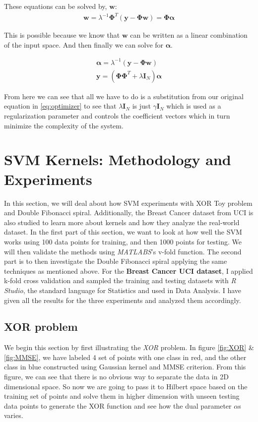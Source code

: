 \documentclass[conference]{IEEEtran}
\begin{document}
These equations can be solved by, $\mathbf{w}$: 
\begin{align*}
\mathbf{w} = \lambda^{-1} \mathbf{\Phi}^T (\mathbf{y} - \mathbf{\Phi} \mathbf{w}) = \mathbf{\Phi}\mathbf{\alpha}
\end{align*}

This is possible because we know that $\mathbf{w}$ can be written as a linear combination of the input space. And then finally we can solve
for $\mathbf{\alpha}$.

\begin{align*}
\bm{\alpha} = \lambda^{-1}(\mathbf{y} - \mathbf{\Phi} \mathbf{w}) \\
\mathbf{y} = (\mathbf{\Phi \Phi}^T + \lambda\mathbf{I}_N)\mathbf{\alpha}
\end{align*}

From here we can see that all we have to do is a substitution from our original equation in \ref{eq:optimizer} to see that
$\lambda\bm{I}_N$ is just $\gamma\bm{I}_N$ which is used as a regularization parameter and controls the coefficient vectors which in turn minimize the complexity 
of the system. 

\section{SVM Kernels: Methodology and Experiments}
In this section, we will deal about how SVM experiments with XOR Toy problem and Double Fibonacci spiral. Additionally, the Breast Cancer dataset from UCI is also studied to learn more about kernels and how they analyze the real-world dataset. In the first part of this section, we want to look at how well the SVM works using
100 data points for training, and then 1000 points for testing. We will
then validate the methods using \textit{MATLABS}'s v-fold function. The
second part is to then investigate the Double Fibonacci spiral applying
the same techniques as mentioned above. For the \textbf{Breast Cancer UCI dataset}, I applied k-fold cross validation and sampled the training and testing datasets with \textit{R Studio}, the standard language for Statistics and used in Data Analysis. I have given all the results for the three experiments and analyzed them accordingly.

\subsection{XOR problem}
We begin this section by first illustrating the \textit{XOR} problem. In figure 
\ref{fig:XOR} \& \ref{fig:MMSE}, we have labeled 4 set of points with one class in red, and the other class in blue constructed using Gaussian kernel and MMSE criterion. From this figure, we can see that there is no obvious way to separate the data in 2D dimensional space. So now we are going to pass it to Hilbert space based on the training set of points and solve them in higher dimension with unseen testing data points to generate the XOR function and see how the dual parameter $\alpha$s varies.  
\end{document}
